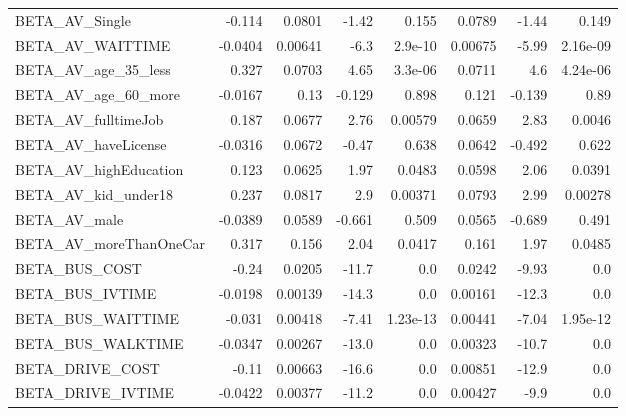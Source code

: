 \begin{tabular}{lrrrrrrr}
BETA\_AV\_Single               &   -0.114 &   0.0801 &   -1.42 &    0.155 &        0.0789 &        -1.44 &         0.149 \\
BETA\_AV\_WAITTIME             &  -0.0404 &  0.00641 &    -6.3 &  2.9e-10 &       0.00675 &        -5.99 &      2.16e-09 \\
BETA\_AV\_age\_35\_less          &    0.327 &   0.0703 &    4.65 &  3.3e-06 &        0.0711 &          4.6 &      4.24e-06 \\
BETA\_AV\_age\_60\_more          &  -0.0167 &     0.13 &  -0.129 &    0.898 &         0.121 &       -0.139 &          0.89 \\
BETA\_AV\_fulltimeJob          &    0.187 &   0.0677 &    2.76 &  0.00579 &        0.0659 &         2.83 &        0.0046 \\
BETA\_AV\_haveLicense          &  -0.0316 &   0.0672 &   -0.47 &    0.638 &        0.0642 &       -0.492 &         0.622 \\
BETA\_AV\_highEducation        &    0.123 &   0.0625 &    1.97 &   0.0483 &        0.0598 &         2.06 &        0.0391 \\
BETA\_AV\_kid\_under18          &    0.237 &   0.0817 &     2.9 &  0.00371 &        0.0793 &         2.99 &       0.00278 \\
BETA\_AV\_male                 &  -0.0389 &   0.0589 &  -0.661 &    0.509 &        0.0565 &       -0.689 &         0.491 \\
BETA\_AV\_moreThanOneCar       &    0.317 &    0.156 &    2.04 &   0.0417 &         0.161 &         1.97 &        0.0485 \\
BETA\_BUS\_COST                &    -0.24 &   0.0205 &   -11.7 &      0.0 &        0.0242 &        -9.93 &           0.0 \\
BETA\_BUS\_IVTIME              &  -0.0198 &  0.00139 &   -14.3 &      0.0 &       0.00161 &        -12.3 &           0.0 \\
BETA\_BUS\_WAITTIME            &   -0.031 &  0.00418 &   -7.41 & 1.23e-13 &       0.00441 &        -7.04 &      1.95e-12 \\
BETA\_BUS\_WALKTIME            &  -0.0347 &  0.00267 &   -13.0 &      0.0 &       0.00323 &        -10.7 &           0.0 \\
BETA\_DRIVE\_COST              &    -0.11 &  0.00663 &   -16.6 &      0.0 &       0.00851 &        -12.9 &           0.0 \\
BETA\_DRIVE\_IVTIME            &  -0.0422 &  0.00377 &   -11.2 &      0.0 &       0.00427 &         -9.9 &           0.0 \\

\end{tabular}
